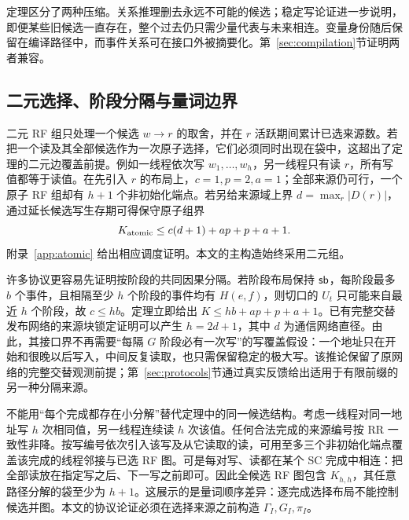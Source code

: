 定理区分了两种压缩。关系推理删去永远不可能的候选；稳定写论证进一步说明，即便某些旧候选一直存在，整个过去仍只需少量代表与未来相连。变量身份随后保留在编译路径中，而事件关系可在接口外被摘要化。第~\ref{sec:compilation}节证明两者兼容。

\subsection{二元选择、阶段分隔与量词边界}
二元 RF 组只处理一个候选 $w\to r$ 的取舍，并在 $r$ 活跃期间累计已选来源数。若把一个读及其全部候选作为一次原子选择，它们必须同时出现在袋中，这超出了定理的二元边覆盖前提。例如一线程依次写 $w_1,\ldots,w_h$，另一线程只有读 $r$，所有写值都等于读值。在先引入 $r$ 的布局上，$c=1,p=2,a=1$；全部来源仍可行，一个原子 RF 组却有 $h+1$ 个非初始化端点。若另给来源域上界 $d=\max_r|D(r)|$，通过延长候选写生存期可得保守原子组界
\[
 K_{\rm atomic}\le c(d+1)+ap+p+a+1.
\]
附录~\ref{app:atomic} 给出相应调度证明。本文的主构造始终采用二元组。

许多协议更容易先证明按阶段的共同因果分隔。若阶段布局保持 $\mathsf{sb}$，每阶段最多 $b$ 个事件，且相隔至少 $h$ 个阶段的事件均有 $H(e,f)$，则切口的 $U_t$ 只可能来自最近 $h$ 个阶段，故 $c\le hb$。定理立即给出 $K\le hb+ap+p+a+1$。已有完整交替发布网络的来源块锁定证明可以产生 $h=2d+1$，其中 $d$ 为通信网络直径。由此，其接口界不再需要“每隔 $G$ 阶段必有一次写”的写覆盖假设：一个地址只在开始和很晚以后写入，中间反复读取，也只需保留稳定的极大写。该推论保留了原网络的完整交替观测前提；第~\ref{sec:protocols}节通过真实反馈给出适用于有限前缀的另一种分隔来源。

不能用“每个完成都存在小分解”替代定理中的同一候选结构。考虑一线程对同一地址写 $h$ 次相同值，另一线程连续读 $h$ 次该值。任何合法完成的来源编号按 RR 一致性非降。按写编号依次引入该写及从它读取的读，可用至多三个非初始化端点覆盖该完成的线程邻接与已选 RF 图。可是每对写、读都在某个 SC 完成中相连：把全部读放在指定写之后、下一写之前即可。因此全候选 RF 图包含 $K_{h,h}$，其任意路径分解的袋至少为 $h+1$。这展示的是量词顺序差异：逐完成选择布局不能控制候选并图。本文的协议论证必须在选择来源之前构造 $\Gamma_I,G_I,\pi_I$。
